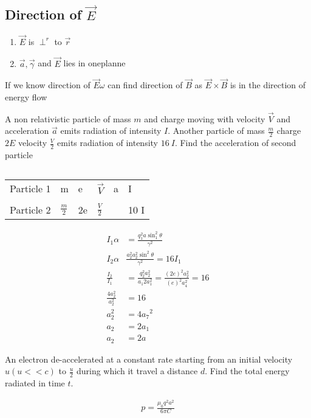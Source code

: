 \subsection{Direction of $\vec{E}$}
\begin{enumerate}
	\item $\vec{E}$ is $\perp^{r}$ to $\vec{r}$
	\item $\vec{a}, \vec{\gamma}$ and $\vec{E}$ lies in oneplanne
\end{enumerate}
If we know direction of $\vec{E} \omega$ can find direction of $\vec{B}$ as $\vec{E}\times\vec{B}$ is in the direction of energy flow
\begin{exercise}
	A non relativistic particle of mass $m$ and charge moving with velocity $\vec{V}$ and acceleration $\vec{a}$ emits radiation of intensity $I$. Another particle of mass $\frac{m}{2}$ charge $2E$ velocity $\frac{V}{2}$ emits radiation of intensity $16 \ I$. Find the acceleration of second particle 
\end{exercise}
\begin{answer}$\left. \right. $\\
\begin{tabular}{p{2cm}p{1cm}p{0.5cm}p{0.5cm}p{0.5cm}p{0.7cm}}
	Particle 1&m&e&$\vec{V}$&a&I\\\\
	Particle 2&$\frac{m}{2}$&2e&$\frac{V}{2}$& &10 I\\
\end{tabular}
\begin{align*}
I_{1} \alpha &= \frac{q_{1}^{2} a \sin _{1}^{2} \theta}{\gamma^{2}}\\
I_{2} \alpha &\frac{a_{2}^{2} a_{2}^{2} \sin ^{2} \theta}{\gamma^{2}}=16 I_{1}\\
\frac{I_{2}}{I_{1}}&=\frac{q_{2}^{2} a_{2}^{2}}{a_{1} 2 a_{1}^{2}}=\frac{(2 e)^{2} a_{2}^{2}}{(e)^{2} a_{4}^{2}}=16\\
\frac{4 a_{2}^{2}}{a_{2}^{2}}&=16\\
a_{2}^{2}&=4 a_{7}{ }^{2}\\
a_{2}&=2 a_{1}\\
a_{2}&=2 a
\end{align*}
\end{answer}
\begin{exercise}
	An electron de-accelerated at a constant rate starting from an initial velocity $u(u<<c)$ to $\frac{u}{2}$ during which it travel a distance $d$. Find the total energy radiated in time $t$.
\end{exercise}
\begin{answer}
	\begin{align*}
	p=\frac{\mu_{0}q^2 a^2}{6\pi C}
	\end{align*}
\end{answer}























